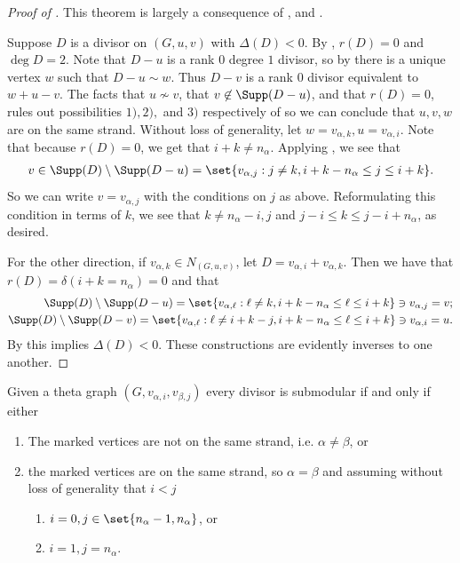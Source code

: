 \begin{proof}[Proof of ]
This theorem is largely a consequence of , and .

Suppose $D$ is a divisor on $(G,u,v)$ with $\Delta(D)<0$. By , $r(D) = 0$ and $\deg D  = 2$. Note that $D-u$ is a rank $0$ degree $1$ divisor, so by  there is a unique vertex $w$ such that $D-u\sim w$. Thus $D-v$ is a rank $0$ divisor equivalent to $w+u-v$. The facts that $u \not \sim v$, that $v \not \in \Supp(D-u)$, and that $r(D) = 0$, rules out possibilities $1),2),$ and $3)$ respectively of  so we can conclude that $u,v,w$ are on the same strand. Without loss of generality, let $w = v_{\alpha,k}, u = v_{\alpha,i}$. Note that because $r(D) = 0$, we get that $i+k \neq n_\alpha$. Applying , we see that
\begin{align*}
    v \in \Supp(D)\setminus \Supp(D-u) = \set{v_{\alpha,j}:j \neq k,i+k-n_\alpha \leq j\leq i+k}.
\end{align*}
So we can write $v = v_{\alpha,j}$ with the conditions on $j$ as above. Reformulating this condition in terms of $k$, we see that $k \neq n_\alpha-i,j$ and $j-i\leq k \leq j-i+n_\alpha$, as desired.

For the other direction, if $v_{\alpha,k} \in N_{(G,u,v)}$, let $D = v_{\alpha,i}+v_{\alpha,k}$. Then we have that $r(D) = \delta(i+k = n_\alpha) = 0$ and that
\begin{align*}
    \Supp(D)\setminus\Supp(D-u) = \set{v_{\alpha,\ell}:\ell \neq k,i+k-n_\alpha\leq \ell \leq i+k} \ni v_{\alpha,j} = v;\\
    \Supp(D)\setminus\Supp(D-v) = \set{v_{\alpha,\ell}:\ell \neq i+k-j,i+k-n_\alpha\leq \ell \leq i+k} \ni v_{\alpha,i} = u.
\end{align*}
By  this implies $\Delta(D)<0$. These constructions are evidently inverses to one another.
\end{proof}

\begin{coro}\label{cor-allSubmodSameStrand}
    Given a theta graph $(G,v_{\alpha,i},v_{\beta,j})$ every divisor is submodular if and only if either
    \begin{enumerate}[label = \arabic*)]
        \item The marked vertices are not on the same strand, i.e. $\alpha \neq \beta$, or
        \item the marked vertices are on the same strand, so $\alpha = \beta$ and assuming without loss of generality that $i<j$
        \begin{enumerate}[label = \alph*)]
            \item $i = 0, j \in \set{n_\alpha-1,n_\alpha}$, or
            \item $i = 1, j = n_\alpha$.
        \end{enumerate}
    \end{enumerate}
\end{coro}


